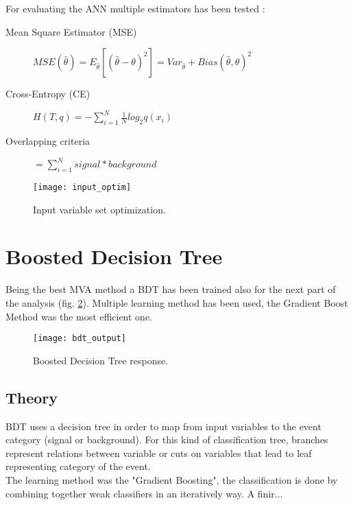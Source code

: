 For evaluating the ANN multiple estimators has been tested :
\begin{description}
	\item [Mean Square Estimator (MSE)] $ MSE(\hat{\theta}) = E_{\hat{\theta}} [(\hat{\theta} - \theta)^2] =
    Var_{\hat{\theta}} + Bias(\hat{\theta}, \theta)^2$
	\item [Cross-Entropy (CE)] $ H(T,q) = -\sum_{i=1}^{N}{\frac{1}{N} log_2 q(x_i)}$
	\item [Overlapping criteria] $ = \sum_{i=1}^{N}{signal*background}$
\end{description}

\begin{figure}[h!]
    \texttt{[image: input\_optim]}
    \caption{Input variable set optimization.}
    \label{input_optim}
\end{figure}


\section{Boosted Decision Tree}

Being the best MVA method a BDT has been trained also for the next part of the analysis (fig. \ref{bdt_output}).
Multiple learning method has been used, the Gradient Boost Method was the most efficient one.
\begin{figure}[h!]
\centering
    \texttt{[image: bdt\_output]}
    \caption{Boosted Decision Tree response.}
    \label{bdt_output}
\end{figure}

\subsection{Theory}

BDT uses a decision tree in order to map from input variables to the event category (signal or background).
For this kind of classification tree, branches represent relations between variable or cuts on variables that lead to leaf representing category of the event.\\
The learning method was the "Gradient Boosting", the classification is done by combining together weak classifiers in an iteratively way.
A finir...


